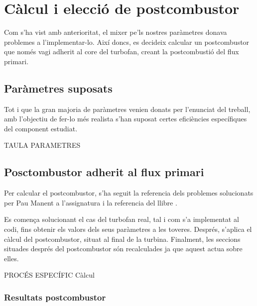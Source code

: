 \section{Càlcul i elecció de postcombustor}
Com s'ha vist amb anterioritat, el mixer pe'ls nostres paràmetres donava problemes a l'implementar-lo. Així doncs, es decideix calcular un postcombustor que només vagi adherit al core del turbofan, creant la postcombustió del flux primari.

\subsection{Paràmetres suposats }
Tot i que la gran majoria de paràmetres venien donats per l'enunciat del treball, amb l'objectiu de fer-lo més realista s'han suposat certes eficiències específiques del component estudiat.

TAULA PARAMETRES

\subsection{Posctombustor adherit al flux primari}
Per calcular el postcombustor, s'ha seguit la referencia dels problemes solucionats per Pau Manent a l'assignatura i la referencia del llibre \cite{mattingly}.

\noindent Es comença solucionant el cas del turbofan real, tal i com s'a implementat al codi, fins obtenir els valors dels seus paràmetres a les toveres. Després, s'aplica el càlcul del postcombustor, situat al final de la turbina. Finalment, les seccions situades després del postcombustor són recalculades ja que aquest actua sobre elles.

PROCÉS ESPECÍFIC Càlcul

\subsubsection{Resultats postcombustor}

